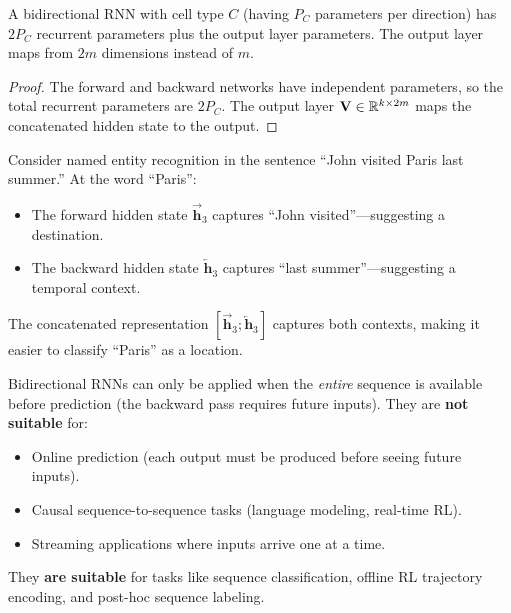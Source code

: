 \documentclass[11pt,a4paper]{article}
\begin{document}
\begin{proposition}
\label{prop:bidir-params}
A bidirectional RNN with cell type $C$ (having $P_C$ parameters per
direction) has $2P_C$ recurrent parameters plus the output layer
parameters.  The output layer maps from $2m$ dimensions instead of
$m$.
\end{proposition}

\begin{proof}
The forward and backward networks have independent parameters, so
the total recurrent parameters are $2P_C$.  The output layer
$\mathbf{V} \in \mathbb{R}^{k \times 2m}$ maps the concatenated hidden
state to the output.
\end{proof}

\begin{example}
\label{ex:bidir-context}
Consider named entity recognition in the sentence
``John visited Paris last summer.''  At the word ``Paris'':
\begin{itemize}[nosep]
  \item The forward hidden state $\overrightarrow{\mathbf{h}}_3$
    captures ``John visited''---suggesting a destination.
  \item The backward hidden state $\overleftarrow{\mathbf{h}}_3$
    captures ``last summer''---suggesting a temporal context.
\end{itemize}
The concatenated representation $[\overrightarrow{\mathbf{h}}_3;
\overleftarrow{\mathbf{h}}_3]$ captures both contexts, making it
easier to classify ``Paris'' as a location.
\end{example}

\begin{warning}[title={Bidirectional RNNs Require Full Sequences}]
Bidirectional RNNs can only be applied when the \emph{entire}
sequence is available before prediction (the backward pass requires
future inputs).  They are \textbf{not suitable} for:
\begin{itemize}[nosep]
  \item Online prediction (each output must be produced before
    seeing future inputs).
  \item Causal sequence-to-sequence tasks (language modeling,
    real-time RL).
  \item Streaming applications where inputs arrive one at a time.
\end{itemize}
They \textbf{are suitable} for tasks like sequence classification,
offline RL trajectory encoding, and post-hoc sequence labeling.
\end{warning}
\end{document}
